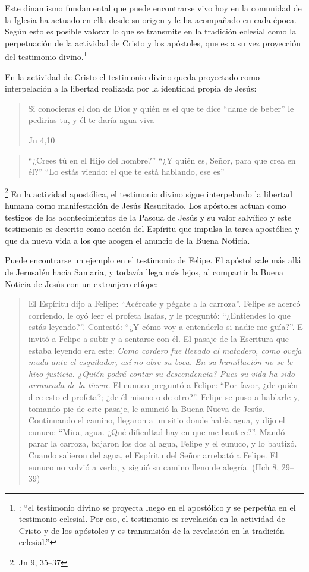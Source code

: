 Este dinamismo fundamental que puede encontrarse vivo hoy en la comunidad de la Iglesia ha actuado en ella desde su origen y le ha acompañado en cada época. Según esto es posible valorar lo que se transmite en la tradición eclesial como la perpetuación de la actividad de Cristo y los apóstoles, que es a su vez proyección del testimonio divino.\footnote{\cite[Cf.~][573]{ninot2009tf}: \enquote{el testimonio divino se proyecta luego en el apostólico y se perpetúa en el testimonio eclesial. Por eso, el testimonio es revelación en la actividad de Cristo y de los apóstoles y es transmisión de la revelación en la tradición eclesial.}}

En la actividad de Cristo el testimonio divino queda proyectado como interpelación a la libertad realizada por la identidad propia de Jesús: \blockquote[Jn 4,10]{Si conocieras el don de Dios y quién es el que te dice \enquote{dame de beber} le pedirías tu, y él te daría agua viva}; \blockquote{\enquote{¿Crees tú en el Hijo del hombre?}\textelp{} \enquote{¿Y quién es, Señor, para que crea en él?}\textelp{} \enquote{Lo estás viendo: el que te está hablando, ese es}}.\footnote{Jn 9, 35--37} En la actividad apostólica, el testimonio divino sigue interpelando la libertad humana como manifestación de Jesús Resucitado. Los apóstoles actuan como testigos de los acontecimientos de la Pascua de Jesús y su valor salvífico\autocite[Cf.][576]{ninot2009tf} y este testimonio es descrito como acción del Espíritu que impulsa la tarea apostólica y que da nueva vida a los que acogen el anuncio de la Buena Noticia.

Puede encontrarse un ejemplo en el testimonio de Felipe. El apóstol sale más allá de Jerusalén hacia Samaria, y todavía llega más lejos, al compartir la Buena Noticia de Jesús con un extranjero etíope: \blockquote[]{El Espíritu dijo a Felipe: \enquote{Acércate y pégate a la carroza}. Felipe se acercó corriendo, le oyó leer el profeta Isaías, y le preguntó: \enquote{¿Entiendes lo que estás leyendo?}. Contestó: \enquote{¿Y cómo voy a entenderlo si nadie me guía?}. E invitó a Felipe a subir y a sentarse con él. El pasaje de la Escritura que estaba leyendo era este: \emph{Como cordero fue llevado al matadero, como oveja muda ante el esquilador, así no abre su boca. En su humillación no se le hizo justicia. ¿Quién podrá contar su descendencia? Pues su vida ha sido arrancada de la tierra.} El eunuco preguntó a Felipe: \enquote{Por favor, ¿de quién dice esto el profeta?; ¿de él mismo o de otro?}. Felipe se puso a hablarle y, tomando pie de este pasaje, le anunció la Buena Nueva de Jesús. Continuando el camino, llegaron a un sitio donde había agua, y dijo el eunuco: \enquote{Mira, agua. ¿Qué dificultad hay en que me bautice?}. Mandó parar la carroza, bajaron los dos al agua, Felipe y el eunuco, y lo bautizó. Cuando salieron del agua, el Espíritu del Señor arrebató a Felipe. El eunuco no volvió a verlo, y siguió su camino lleno de alegría. (Hch 8, 29--39)}

